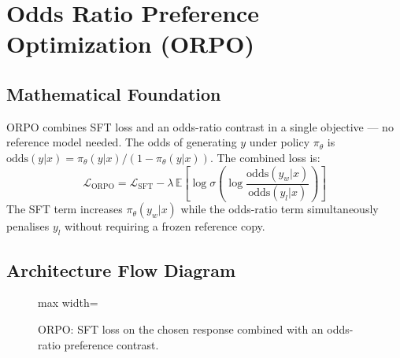 \newpage
\section{Odds Ratio Preference Optimization (ORPO)}

\subsection{Mathematical Foundation}
ORPO combines SFT loss and an odds-ratio contrast in a single objective — no reference model needed. The odds of generating $y$ under policy $\pi_\theta$ is $\text{odds}(y|x) = \pi_\theta(y|x)/(1-\pi_\theta(y|x))$. The combined loss is:
\begin{equation}
  \mathcal{L}_{\text{ORPO}} = \mathcal{L}_{\text{SFT}} - \lambda\,\mathbb{E}\!\left[\log\sigma\!\left(\log\frac{\text{odds}(y_w|x)}{\text{odds}(y_l|x)}\right)\right]
\end{equation}
The SFT term increases $\pi_\theta(y_w|x)$ while the odds-ratio term simultaneously penalises $y_l$ without requiring a frozen reference copy.

\subsection{Architecture Flow Diagram}

\begin{figure}[h]
\centering
\begin{adjustbox}{max width=\linewidth}
\end{adjustbox}
\caption{ORPO: SFT loss on the chosen response combined with an odds-ratio preference contrast.}
\end{figure}

